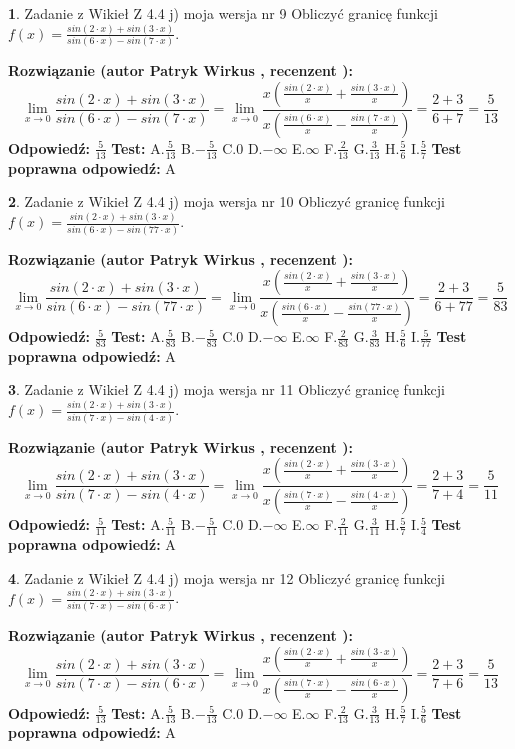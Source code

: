 \documentclass[12pt, a4paper]{article}
\theoremstyle{definition} %
\newtheorem{zad}{}
\newcommand{\zadStart}[1]{\begin{zad}#1\newline}
\newcommand{\zadStop}{\end{zad}}
\newcommand{\rozwStart}[2]{\noindent \textbf{Rozwiązanie (autor #1 , recenzent #2): }\newline}
\newcommand{\rozwStop}{\newline}
\newcommand{\odpStart}{\noindent \textbf{Odpowiedź:}\newline}
\newcommand{\odpStop}{\newline}
\newcommand{\testStart}{\noindent \textbf{Test:}\newline}
\newcommand{\testStop}{\newline}
\newcommand{\kluczStart}{\noindent \textbf{Test poprawna odpowiedź:}\newline}
\newcommand{\kluczStop}{\newline}
\begin{document}
\zadStart{Zadanie z Wikieł Z 4.4 j) moja wersja nr 9}
Obliczyć granicę funkcji $f(x)=\frac{sin(2\cdot x) +sin(3\cdot x)}{sin(6\cdot x) -sin(7\cdot x)}$.
\zadStop
\rozwStart{Patryk Wirkus}{}
$$\lim\limits_{x\to 0}\frac{sin(2\cdot x) +sin(3\cdot x)}{sin(6\cdot x) -sin(7\cdot x)}=\lim\limits_{x\to 0}\frac{x(\frac{sin(2\cdot x)}{x}+\frac{sin(3\cdot x)}{x})}{x(\frac{sin(6\cdot x)}{x}-\frac{sin(7\cdot x)}{x})}=\frac{2+3}{6+7} = \frac{5}{13}$$
\rozwStop
\odpStart
$\frac{5}{13}$
\odpStop
\testStart
A.$\frac{5}{13}$
B.$-\frac{5}{13}$
C.$0$
D.$-\infty$
E.$\infty$
F.$\frac{2}{13}$
G.$\frac{3}{13}$
H.$\frac{5}{6}$
I.$\frac{5}{7}$
\testStop
\kluczStart
A
\kluczStop



\zadStart{Zadanie z Wikieł Z 4.4 j) moja wersja nr 10}
Obliczyć granicę funkcji $f(x)=\frac{sin(2\cdot x) +sin(3\cdot x)}{sin(6\cdot x) -sin(77\cdot x)}$.
\zadStop
\rozwStart{Patryk Wirkus}{}
$$\lim\limits_{x\to 0}\frac{sin(2\cdot x) +sin(3\cdot x)}{sin(6\cdot x) -sin(77\cdot x)}=\lim\limits_{x\to 0}\frac{x(\frac{sin(2\cdot x)}{x}+\frac{sin(3\cdot x)}{x})}{x(\frac{sin(6\cdot x)}{x}-\frac{sin(77\cdot x)}{x})}=\frac{2+3}{6+77} = \frac{5}{83}$$
\rozwStop
\odpStart
$\frac{5}{83}$
\odpStop
\testStart
A.$\frac{5}{83}$
B.$-\frac{5}{83}$
C.$0$
D.$-\infty$
E.$\infty$
F.$\frac{2}{83}$
G.$\frac{3}{83}$
H.$\frac{5}{6}$
I.$\frac{5}{77}$
\testStop
\kluczStart
A
\kluczStop



\zadStart{Zadanie z Wikieł Z 4.4 j) moja wersja nr 11}
Obliczyć granicę funkcji $f(x)=\frac{sin(2\cdot x) +sin(3\cdot x)}{sin(7\cdot x) -sin(4\cdot x)}$.
\zadStop
\rozwStart{Patryk Wirkus}{}
$$\lim\limits_{x\to 0}\frac{sin(2\cdot x) +sin(3\cdot x)}{sin(7\cdot x) -sin(4\cdot x)}=\lim\limits_{x\to 0}\frac{x(\frac{sin(2\cdot x)}{x}+\frac{sin(3\cdot x)}{x})}{x(\frac{sin(7\cdot x)}{x}-\frac{sin(4\cdot x)}{x})}=\frac{2+3}{7+4} = \frac{5}{11}$$
\rozwStop
\odpStart
$\frac{5}{11}$
\odpStop
\testStart
A.$\frac{5}{11}$
B.$-\frac{5}{11}$
C.$0$
D.$-\infty$
E.$\infty$
F.$\frac{2}{11}$
G.$\frac{3}{11}$
H.$\frac{5}{7}$
I.$\frac{5}{4}$
\testStop
\kluczStart
A
\kluczStop



\zadStart{Zadanie z Wikieł Z 4.4 j) moja wersja nr 12}
Obliczyć granicę funkcji $f(x)=\frac{sin(2\cdot x) +sin(3\cdot x)}{sin(7\cdot x) -sin(6\cdot x)}$.
\zadStop
\rozwStart{Patryk Wirkus}{}
$$\lim\limits_{x\to 0}\frac{sin(2\cdot x) +sin(3\cdot x)}{sin(7\cdot x) -sin(6\cdot x)}=\lim\limits_{x\to 0}\frac{x(\frac{sin(2\cdot x)}{x}+\frac{sin(3\cdot x)}{x})}{x(\frac{sin(7\cdot x)}{x}-\frac{sin(6\cdot x)}{x})}=\frac{2+3}{7+6} = \frac{5}{13}$$
\rozwStop
\odpStart
$\frac{5}{13}$
\odpStop
\testStart
A.$\frac{5}{13}$
B.$-\frac{5}{13}$
C.$0$
D.$-\infty$
E.$\infty$
F.$\frac{2}{13}$
G.$\frac{3}{13}$
H.$\frac{5}{7}$
I.$\frac{5}{6}$
\testStop
\kluczStart
A
\kluczStop
\end{document}
